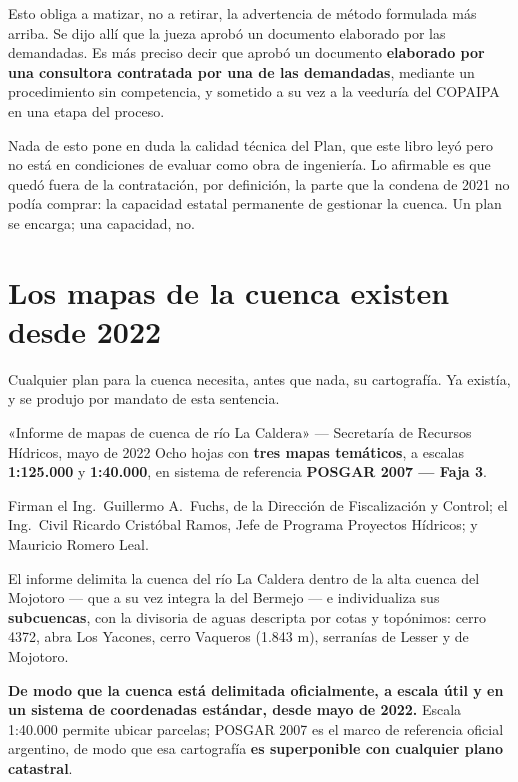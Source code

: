 \begin{cautela}
Esto obliga a matizar, no a retirar, la advertencia de método formulada más arriba. Se dijo allí que la jueza aprobó un documento elaborado por las demandadas. Es más preciso decir que aprobó un documento \textbf{elaborado por una consultora contratada por una de las demandadas}, mediante un procedimiento sin competencia, y sometido a su vez a la veeduría del COPAIPA en una etapa del proceso.

Nada de esto pone en duda la calidad técnica del Plan, que este libro leyó pero no está en condiciones de evaluar como obra de ingeniería. Lo afirmable es que quedó fuera de la contratación, por definición, la parte que la condena de 2021 no podía comprar: la capacidad estatal permanente de gestionar la cuenca. Un plan se encarga; una capacidad, no.
\end{cautela}

\section{Los mapas de la cuenca existen desde 2022}

Cualquier plan para la cuenca necesita, antes que nada, su cartografía. Ya
existía, y se produjo por mandato de esta sentencia.

\begin{ficha}{«Informe de mapas de cuenca de río La Caldera» --- Secretaría de Recursos Hídricos, mayo de 2022}
Ocho hojas con \textbf{tres mapas temáticos}, a escalas \textbf{1:125.000} y \textbf{1:40.000},
en sistema de referencia \textbf{POSGAR 2007 --- Faja 3}.

Firman el Ing.\ Guillermo A.\ Fuchs, de la Dirección de Fiscalización y Control; el Ing.\ Civil
Ricardo Cristóbal Ramos, Jefe de Programa Proyectos Hídricos; y Mauricio Romero Leal.

El informe delimita la cuenca del río La Caldera dentro de la alta cuenca del Mojotoro ---
que a su vez integra la del Bermejo --- e individualiza sus \textbf{subcuencas}, con la
divisoria de aguas descripta por cotas y topónimos: cerro 4372, abra Los Yacones, cerro
Vaqueros (1.843 m), serranías de Lesser y de Mojotoro.
\end{ficha}

\textbf{De modo que la cuenca está delimitada oficialmente, a escala útil y en un sistema de
coordenadas estándar, desde mayo de 2022.} Escala 1:40.000 permite ubicar parcelas; POSGAR
2007 es el marco de referencia oficial argentino, de modo que esa cartografía \textbf{es
superponible con cualquier plano catastral}.

